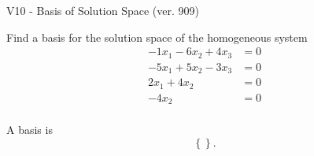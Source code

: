 \begin{exercise}
  \begin{exerciseTitle}V10 - Basis of Solution Space (ver. 909)\end{exerciseTitle}
  \begin{exerciseStatement}
    Find a basis for the solution space of the homogeneous system 
\begin{align*}
 -1 x_ 1 -6 x_ 2 + 4 x_ 3 &= 0  \\ 
  -5 x_ 1 + 5 x_ 2 -3 x_ 3 &= 0  \\ 
  2 x_ 1 + 4 x_ 2 &= 0  \\ 
  -4 x_ 2 &= 0  \\ 
 \end{align*}


 
  \end{exerciseStatement}

  \begin{exerciseAnswer}
   A basis is   
\[\left\{\right\}.\]

  


  \end{exerciseAnswer}
\end{exercise}